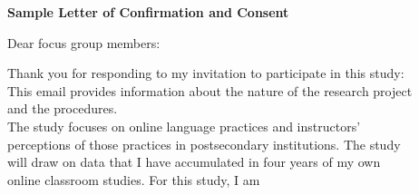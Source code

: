 \documentclass[a4,9pt]{beamer}
\begin{document}
\begin{frame}
\begin{center}
  \textbf{Sample Letter of Confirmation and Consent}\\
\end{center}

\vspace*{0.3cm}
\hspace*{0.7cm} Dear focus group members: \\
\vspace*{0.5cm}
 
\hspace*{0.7cm} Thank you for responding to my invitation to participate in this study:\\
\hspace*{0.7cm} This email provides information about the nature of the research project\\
\hspace*{0.7cm} and the procedures.\\

\vspace*{0.4cm}
\hspace*{0.7cm} The study focuses on online language practices and instructors' \\
\hspace*{0.7cm} perceptions of those practices in postsecondary institutions. The study \\ 
\hspace*{0.7cm} will draw on data that I have accumulated in four years of my own \\
\hspace*{0.7cm} online classroom studies. For this study, I am\\
\end{frame}
\end{document}

